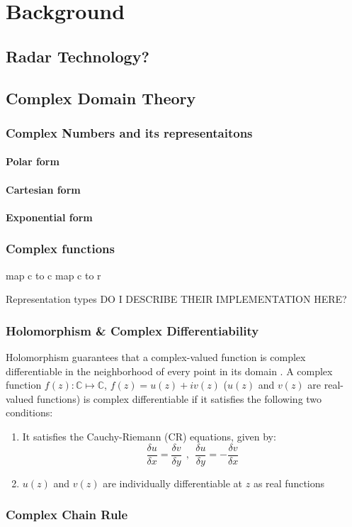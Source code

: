 \chapter{Background}\label{chap:comp}
\section{Radar Technology?}


\section{Complex Domain Theory}

\subsection{Complex Numbers and its representaitons}
\subsubsection{Polar form}
\subsubsection{Cartesian form}
\subsubsection{Exponential form}
\subsection{Complex functions}
map c to c
map c to r



Representation types
DO I DESCRIBE THEIR IMPLEMENTATION HERE?

\subsection{Holomorphism \& Complex Differentiability}

Holomorphism guarantees that a complex-valued function is complex differentiable in the neighborhood of every point in its domain \cite{trabelsi2018deep}.
A complex function $f(z): \mathbb{C} \mapsto \mathbb{C}$, $f(z)= u(z) + iv(z)$ ($u(z)$ and $v(z)$ are real-valued functions) is complex differentiable if it satisfies the following two conditions:
\begin{enumerate}

	\item It satisfies the Cauchy-Riemann (CR) equations, given by:
\begin{equation}\label{eq:compdiff}
\frac{\delta u}{\delta x} = \frac{\delta v}{\delta y} ~~,~~ \frac{\delta u}{\delta y} = - \frac{\delta v}{\delta x} 
\end{equation}
	\item $u(z)$ and $v(z)$ are individually differentiable at $z$ as real functions	
\end{enumerate} 


 
\subsection{Complex Chain Rule}\label{cchainrule}



